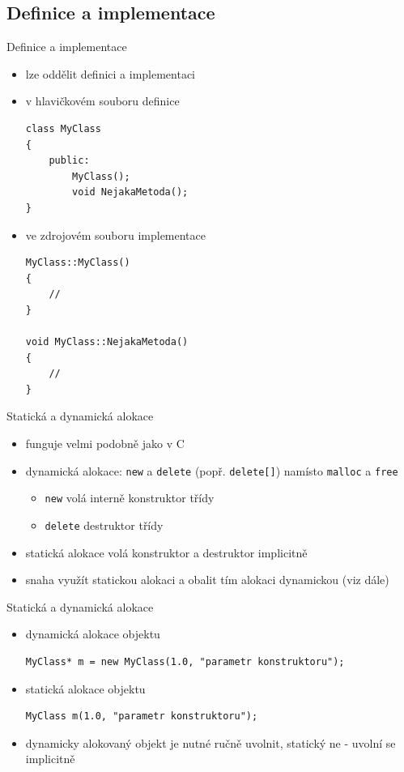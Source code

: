 \documentclass{beamer}
\begin{document}
\subsection{Definice a implementace}


\begin{xframe}{Definice a implementace}
	\begin{itemize}
		\item lze oddělit definici a implementaci
		\item v hlavičkovém souboru definice
\begin{lstlisting}[basicstyle=\fontsize{8}{9}\selectfont\ttfamily]
class MyClass
{
    public:
        MyClass();
        void NejakaMetoda();
}
\end{lstlisting}
		\item ve zdrojovém souboru implementace 
\begin{lstlisting}[basicstyle=\fontsize{8}{9}\selectfont\ttfamily]
MyClass::MyClass()
{
    //
}

void MyClass::NejakaMetoda()
{
    //
}
\end{lstlisting}
	\end{itemize}
\end{xframe}


\begin{xframe}{Statická a dynamická alokace}
	\begin{itemize}
		\item funguje velmi podobně jako v C
		\item dynamická alokace: \texttt{new} a \texttt{delete} (popř. \texttt{delete[]}) namísto \texttt{malloc} a \texttt{free}
			\begin{itemize}
				\item \texttt{new} volá interně konstruktor třídy
				\item \texttt{delete} destruktor třídy
			\end{itemize}
		\item statická alokace volá konstruktor a destruktor implicitně
		\item snaha využít statickou alokaci a obalit tím alokaci dynamickou (viz dále)
	\end{itemize}
\end{xframe}


\begin{xframe}{Statická a dynamická alokace}
	\begin{itemize}
		\item dynamická alokace objektu
\begin{lstlisting}[basicstyle=\fontsize{9}{10}\selectfont\ttfamily]
MyClass* m = new MyClass(1.0, "parametr konstruktoru");
\end{lstlisting}
		\item statická alokace objektu
\begin{lstlisting}[basicstyle=\fontsize{9}{10}\selectfont\ttfamily]
MyClass m(1.0, "parametr konstruktoru");
\end{lstlisting}

		\item dynamicky alokovaný objekt je nutné ručně uvolnit, statický ne - uvolní se implicitně
	\end{itemize}
\end{xframe}
\end{document}
